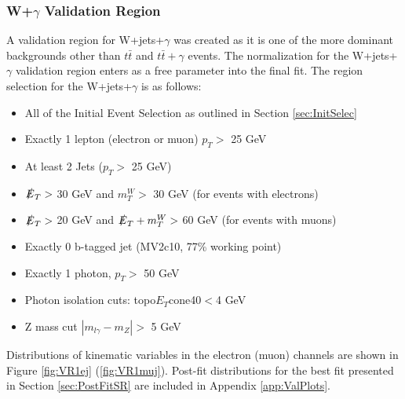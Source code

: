 \subsubsection{W+$\gamma$ Validation Region}
A validation region for W+jets+$\gamma$ was created as it is one of the more dominant backgrounds other than $t\bar{t}$ and $t\bar{t}+\gamma$ events.  The normalization for the W+jets+$\gamma$ validation region enters as a free parameter into the final fit. The region selection for the W+jets+$\gamma$ is as follows:
\begin{itemize}
\item All of the Initial Event Selection as outlined in Section \ref{sec:InitSelec}
\item Exactly 1 lepton (electron or muon) $p_T >$ 25 GeV
\item At least 2 Jets  ($p_T >$ 25 GeV) 
\item $\slashed{E}_T >$ 30 GeV and $m_T^W >$ 30 GeV (for events with electrons)
\item $\slashed{E}_T >$ 20 GeV and $\slashed{E}_T + m_T^W >$ 60 GeV (for events with muons)
\item Exactly 0 b-tagged jet (MV2c10, 77\% working point)
\item Exactly 1 photon, $p_T >$ 50 GeV
\item Photon isolation cuts: topo$E_T$cone40$<$4 GeV
\item Z mass cut $|m_{l\gamma}-m_Z|>$ 5 GeV
\end{itemize}

Distributions of kinematic variables in the electron (muon) channels are shown in Figure \ref{fig:VR1ej} (\ref{fig:VR1muj}). Post-fit distributions for the best fit presented in Section \ref{sec:PostFitSR} are included in Appendix \ref{app:ValPlots}.

